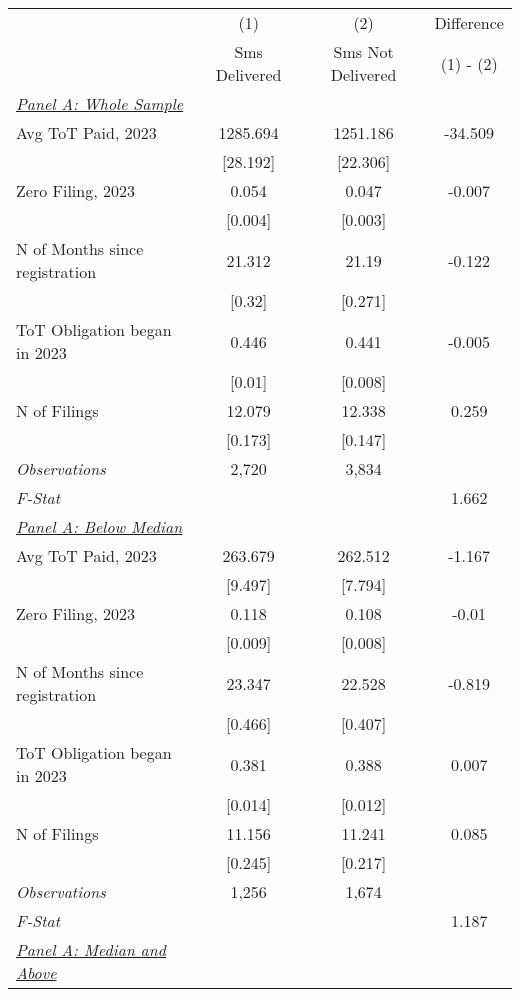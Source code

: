 \begin{tabular}{lccc}
\tabularnewline \midrule \midrule
& (1) & (2) & Difference \\
& Sms Delivered & Sms Not Delivered & (1) - (2) \\ 

\midrule
\multicolumn{1}{l}{\underline{\textit{Panel A: Whole Sample}}} & & & \\ 
 \addlinespace 
Avg ToT Paid, 2023 & 1285.694 & 1251.186 & -34.509\\
 & {}[28.192] & {}[22.306] & \\
Zero Filing, 2023 & 0.054 & 0.047 & -0.007\\
 & {}[0.004] & {}[0.003] & \\
N of Months since registration & 21.312 & 21.19 & -0.122\\
 & {}[0.32] & {}[0.271] & \\
ToT Obligation began in 2023 & 0.446 & 0.441 & -0.005\\
 & {}[0.01] & {}[0.008] & \\
N of Filings & 12.079 & 12.338 & 0.259\\
 & {}[0.173] & {}[0.147] & \\
\midrule
\textit{Observations} & 2,720 & 3,834 & \\
\textit{F-Stat} &  &  & 1.662\\
\midrule
\multicolumn{1}{l}{\underline{\textit{Panel A: Below Median}}} & & & \\ 
 \addlinespace 
Avg ToT Paid, 2023 & 263.679 & 262.512 & -1.167\\
 & {}[9.497] & {}[7.794] & \\
Zero Filing, 2023 & 0.118 & 0.108 & -0.01\\
 & {}[0.009] & {}[0.008] & \\
N of Months since registration & 23.347 & 22.528 & -0.819\\
 & {}[0.466] & {}[0.407] & \\
ToT Obligation began in 2023 & 0.381 & 0.388 & 0.007\\
 & {}[0.014] & {}[0.012] & \\
N of Filings & 11.156 & 11.241 & 0.085\\
 & {}[0.245] & {}[0.217] & \\
\midrule
\textit{Observations} & 1,256 & 1,674 & \\
\textit{F-Stat} &  &  & 1.187\\
\midrule
\multicolumn{1}{l}{\underline{\textit{Panel A: Median and Above}}} & & & \\ 

\end{tabular}
